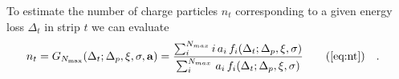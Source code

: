 To estimate the number of charge particles $n_t$ corresponding to a given
energy loss $\Delta_t$ in strip $t$ we can evaluate 
\begin{align}
  n_t &= G_{N_{\text{max}}}(\Delta_t;\Delta_p,\xi,\sigma,\mathbf{a}) =
  \frac{\sum_i^{N_{max}} i\,a_i\,f_i(\Delta_t;\Delta_p,\xi,\sigma)}{
    \sum_i^{N_{max}}\,a_i\,f_i(\Delta_t;\Delta_p,\xi,\sigma)}
  \tag{\ref{eq:nt}}\quad. 
\end{align}

